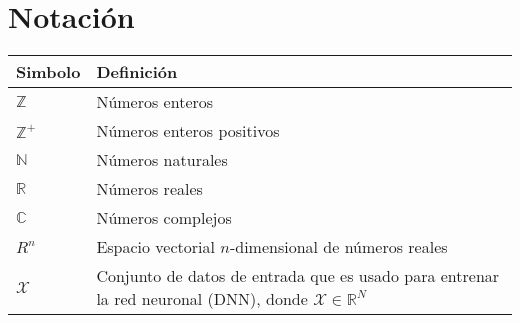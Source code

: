 \chapter{Notación}

\begin{table}[ht!]
    \begin{center}
        \begin{tabularx}{\textwidth}{|l|X|}\hline
            \textbf{Simbolo}                                                                                                     & \textbf{Definición}                                                                                                                                                         \\ \hline
            $\mathbb{Z}$                                                                                                         & Números enteros                                                                                                                                                             \\
            $\mathbb{Z^{+}}$                                                                                                     & Números enteros positivos                                                                                                                                                   \\
            $\mathbb{N}$                                                                                                         & Números naturales                                                                                                                                                           \\
            $\mathbb{R}$                                                                                                         & Números reales                                                                                                                                                              \\
            $\mathbb{C}$                                                                                                         & Números complejos                                                                                                                                                           \\
            $R^{n}$                                                                                                              & Espacio vectorial $n$-dimensional de números reales                                                                                                                         \\
            $\mathcal{X}$                                                                                                        & Conjunto de datos de entrada que es usado para entrenar la red neuronal (\gls{DNN}), donde $\mathcal{X} \in \mathbb{R}^{N}$                                                 \\


\end{tabularx}
\end{center}
\end{table}
